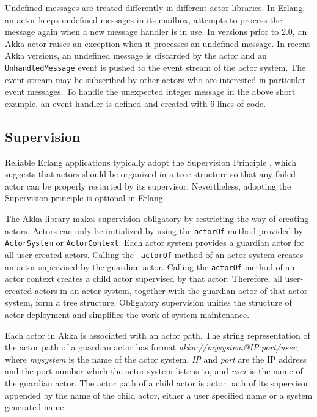 Undefined messages are treated differently in different actor libraries.  In
Erlang, an actor keeps undefined messages in its mailbox, attempts to process
the message again when a new message handler is in use.  In versions prior to
2.0, an Akka actor raises an exception when it processes an undefined message.
In recent Akka versions, an undefined message is discarded by the actor and an
{\tt UnhandledMessage} event is pushed to the event stream of the actor system.
The event stream may be subscribed by other actors who are interested in
particular event messages.  To handle the unexpected integer message in the
above short example, an event handler is defined and created with 6 lines of 
code.


\subsection{Supervision}
\label{akkasup}



Reliable Erlang applications typically adopt the Supervision Principle
 \cite{OTP}, which suggests that actors should be organized in a tree structure 
so that any failed actor can be properly restarted by its supervisor.  
Nevertheless, adopting the Supervision principle is optional in Erlang.

The Akka library makes supervision obligatory by restricting the way of 
creating actors. Actors can only be initialized by using the {\tt actorOf}
method provided by {\tt ActorSystem} or {\tt ActorContext}.  Each actor system
provides a guardian actor for all user-created actors.  Calling the {\tt
actorOf} method of an actor system creates an actor supervised by the 
guardian actor.  Calling the {\tt actorOf} method of an actor context 
creates a child actor supervised by that actor.  Therefore, all user-created  
actors in an actor system, together with the guardian actor of that actor 
system, form a tree structure.  Obligatory supervision unifies the 
structure of actor deployment and simplifies the work of system maintenance.

Each actor in Akka is associated with an actor path.  The string representation
of the actor path of a guardian actor has format 
{\it akka://mysystem@IP:port/user}, where {\it mysystem} is the name of the 
actor system, {\it IP} and {\it port} are the IP address and the 
port number which the actor system listens to, and {\it user} is the name of 
the guardian actor.  The actor path of a child actor is actor path of its 
supervisor appended by the name of the child actor, either a user specified 
name or a system generated name.

